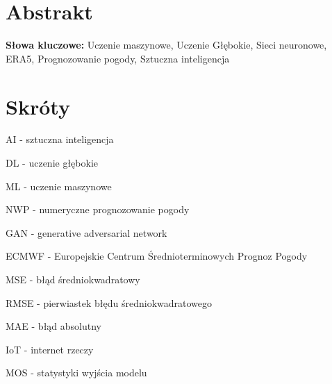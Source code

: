 \documentclass{article}
\begin{document}

\begin{titlepage}
    
\end{titlepage}

\tableofcontents
\pagebreak

\section*{Abstrakt}

\noindent
{\bf Słowa kluczowe:} Uczenie maszynowe, Uczenie Głębokie, Sieci neuronowe,
ERA5, Prognozowanie pogody, Sztuczna inteligencja
\pagebreak










\section*{Skróty}

\raggedright{}

AI - sztuczna inteligencja

DL - uczenie głębokie

ML - uczenie maszynowe

NWP - numeryczne prognozowanie pogody

GAN - generative adversarial network

ECMWF - Europejskie Centrum Średnioterminowych Prognoz Pogody

MSE - błąd średniokwadratowy

RMSE - pierwiastek błędu średniokwadratowego

MAE - błąd absolutny

IoT - internet rzeczy

MOS - statystyki wyjścia modelu

\pagebreak
\printbibliography[title={Bibliografia}]

\end{document}
